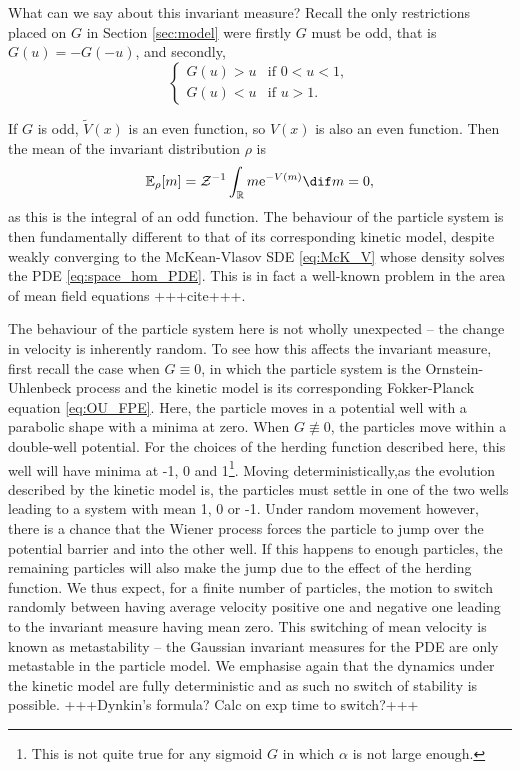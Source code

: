 \documentclass[11pt, a4pape draft]{article}
\begin{document}
        What can we say about this invariant measure? Recall the only restrictions placed on $G$ in Section \ref{sec:model} were firstly $G$ must be odd, that is $G(u)=-G(-u)$, and secondly,
        \[
            \begin{cases}
            G(u)>u & \text{if } 0<u<1,\\ 
            G(u)<u &  \text{if } u>1.
            \end{cases}
        \]
         
        If $G$ is odd, $\tilde{V}(x)$ is an even function, so $V(x)$ is also an even function. Then the mean of the invariant distribution $\rho$ is
        \[
            \mathbb{E}_{\rho}[m] = \mathcal{Z}^{-1}\int_{\mathbb{R}} m \mathrm{e}^{-V(m)}\dif m = 0,
        \]
        as this is the integral of an odd function. The behaviour of the particle system is then fundamentally different to that of its corresponding kinetic model, despite weakly converging to the McKean-Vlasov SDE \eqref{eq:McK_V} whose density solves the PDE \eqref{eq:space_hom_PDE}. This is in fact a well-known problem in the area of mean field equations +++cite+++. 
        
    The behaviour of the particle system here is not wholly unexpected -- the change in velocity is inherently random. To see how this affects the invariant measure, first recall the case when $G\equiv 0$, in which the particle system is the Ornstein-Uhlenbeck process and the kinetic model is its corresponding Fokker-Planck equation \eqref{eq:OU_FPE}. Here, the particle moves in a potential well with a parabolic shape with a minima at zero. When $G\not\equiv 0$, the particles move within a double-well potential. For the choices of the herding function described here, this well will have minima at -1, 0 and 1\footnote{This is not quite true for any sigmoid $G$ in which $\alpha$ is not large enough.}. Moving deterministically,as the evolution described by the kinetic model is, the particles must settle in one of the two wells leading to a system with mean 1, 0 or -1. Under random movement however, there is a chance that the Wiener process forces the particle to jump over the potential barrier and into the other well. If this happens to enough particles, the remaining particles will also make the jump due to the effect of the herding function. We thus expect, for a finite number of particles, the motion to switch randomly between having average velocity positive one and negative one leading to the invariant measure having mean zero. This switching of mean velocity is known as metastability -- the Gaussian invariant measures for the PDE are only metastable in the particle model. We emphasise again that the dynamics under the kinetic model are fully deterministic and as such no switch of stability is possible. +++Dynkin's formula? Calc on exp time to switch?+++
        
\end{document}
